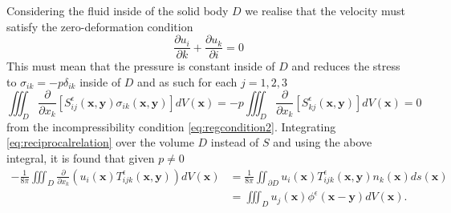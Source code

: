 Considering the fluid inside of the solid body $D$ we realise that the velocity must satisfy the zero-deformation condition
\begin{equation*}
  \frac{\partial u_i}{\partial k} + \frac{\partial u_k}{\partial i} = 0
\end{equation*}
This must mean that the pressure is constant inside of $D$ and reduces the stress to $\sigma_{ik} = -p\delta_{ik}$ inside of $D$ and as such for each $j=1,2,3$
\begin{equation*}
  \iiint_{D} \frac{\partial}{\partial x_k}\left[S^\epsilon_{ij}\left(\bm{x}, \bm{y}\right)\sigma_{ik}\left(\bm{x}, \bm{y}\right)\right]dV(\bm{x}) = -p\iiint_{D} \frac{\partial}{\partial x_k}\left[S^\epsilon_{kj}\left(\bm{x}, \bm{y}\right)\right]dV(\bm{x}) = 0
\end{equation*}
from the incompressibility condition \cref{eq:regcondition2}. Integrating \cref{eq:reciprocalrelation} over the volume $D$ instead of $S$ and using the above integral, it is found that given $p \neq 0$
\begin{equation}
\begin{aligned}
    \label{eq:BIE4}
    -\frac{1}{8\pi}\iiint_{D} \frac{\partial}{\partial x_k}\left(u_i(\bm{x})T^\epsilon_{ijk}\left(\bm{x}, \bm{y}\right) \right) dV(\bm{x}) &= \frac{1}{8\pi}\iint_{\partial D} u_i(\bm{x})T^\epsilon_{ijk}\left(\bm{x}, \bm{y}\right)n_k(\bm{x}) ds(\bm{x})\\
    &= \iiint_D u_j(\bm{x}) \phi^\epsilon(\bm{x}-\bm{y}) dV(\bm{x}).
\end{aligned}
\end{equation}

